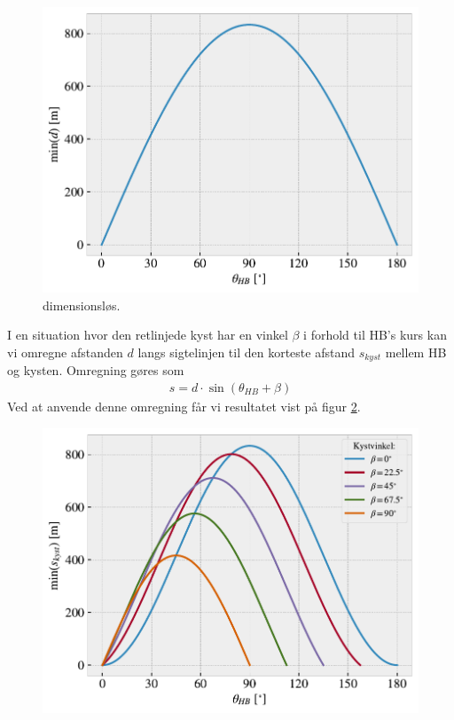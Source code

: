 \documentclass[%
 reprint,
nofootinbib,
aps,
]{revtex4-1}
\begin{document}
\begin{figure}[H]
  \includegraphics[width=\linewidth]{figures/limit_dimension.pdf}
  \caption{dimensionsløs.}
  \label{fig:limit_dimension}
\end{figure}
I en situation hvor den retlinjede kyst har en vinkel $\beta$ i forhold til HB's kurs kan vi omregne afstanden $d$ langs sigtelinjen til den korteste afstand $s_{kyst}$ mellem HB og kysten. Omregning gøres som
\begin{align*}
  s = d\cdot \sin{(\theta_{HB} + \beta)}
\end{align*}
Ved at anvende denne omregning får vi resultatet vist på figur \ref{fig:limit_coastdis}.
\begin{figure}[H]
  \includegraphics[width=\linewidth]{figures/limit_coastdis.pdf}
  \caption{}
  \label{fig:limit_coastdis}
\end{figure}
\end{document}
